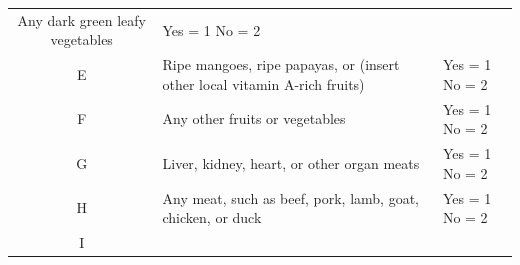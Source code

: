 \documentclass[12pt,]{book}
\theoremstyle{definition}
\theoremstyle{definition}
\theoremstyle{definition}
\theoremstyle{remark}
\begin{document}
\begin{longtable}[]{@{}cll@{}}
\begin{minipage}[t]{0.68\columnwidth}
Any dark green leafy vegetables\strut
\end{minipage} & \begin{minipage}[t]{0.18\columnwidth}\raggedright
Yes = 1 No = 2\strut
\end{minipage}\tabularnewline
\begin{minipage}[t]{0.06\columnwidth}\centering
E\strut
\end{minipage} & \begin{minipage}[t]{0.68\columnwidth}\raggedright
Ripe mangoes, ripe papayas, or (insert other local vitamin A-rich
fruits)\strut
\end{minipage} & \begin{minipage}[t]{0.18\columnwidth}\raggedright
Yes = 1 No = 2\strut
\end{minipage}\tabularnewline
\begin{minipage}[t]{0.06\columnwidth}\centering
F\strut
\end{minipage} & \begin{minipage}[t]{0.68\columnwidth}\raggedright
Any other fruits or vegetables\strut
\end{minipage} & \begin{minipage}[t]{0.18\columnwidth}\raggedright
Yes = 1 No = 2\strut
\end{minipage}\tabularnewline
\begin{minipage}[t]{0.06\columnwidth}\centering
G\strut
\end{minipage} & \begin{minipage}[t]{0.68\columnwidth}\raggedright
Liver, kidney, heart, or other organ meats\strut
\end{minipage} & \begin{minipage}[t]{0.18\columnwidth}\raggedright
Yes = 1 No = 2\strut
\end{minipage}\tabularnewline
\begin{minipage}[t]{0.06\columnwidth}\centering
H\strut
\end{minipage} & \begin{minipage}[t]{0.68\columnwidth}\raggedright
Any meat, such as beef, pork, lamb, goat, chicken, or duck\strut
\end{minipage} & \begin{minipage}[t]{0.18\columnwidth}\raggedright
Yes = 1 No = 2\strut
\end{minipage}\tabularnewline
\begin{minipage}[t]{0.06\columnwidth}\centering
I\strut
\end{minipage} & \begin{minipage}[t]{0.68\columnwidth}\raggedright

\end{minipage}
\end{longtable}
\end{document}
